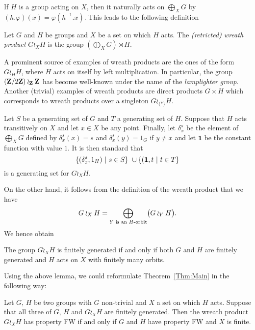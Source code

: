 If $H$ is a group acting on $X$, then it naturally acts on $\bigoplus_XG$
by $(h.\varphi)(x)=\varphi(h^{-1}.x)$.
This leads to the following definition
\begin{defn}\label{Def:WreathProd}
Let $G$ and $H$ be groups and $X$ be a set on which $H$ acts.
The \emph{(retricted) wreath product} $G\wr_XH$ is the group $(\bigoplus_XG)\rtimes H$.
\end{defn}
A prominent  source of examples of wreath products are the ones of the form $G\wr_HH$, where $H$ acts on itself by left multiplication.
In particular, the group $(\mathbf{Z}/2\mathbf{Z})\wr_{\mathbf{Z}}\mathbf{Z}$ has become well-known under the name of the \emph{lamplighter group}.
Another (trivial) examples of wreath products are direct products $G\times H$ which corresponds to wreath products over a singleton $G\wr_{\{*\}}H$.

Let $S$ be a generating set of $G$ and $T$ a generating set of $H$.
Suppose that $H$ acts transitively on $X$ and let $x\in X$ be any point.
Finally, let $\delta_x^s$ be the element of $\bigoplus_XG$ defined by $\delta_x^s(x)=s$ and $\delta_x^s(y)=1_G$ if $y\neq x$ and let $\mathbf 1$ be the constant function with value $1$.
It is then standard that 
\[
	\setst{(\delta_x^s,1_H)}{s \in S} \cup \setst{(\mathbf 1,t}{t \in T}
\]
is a generating set for $G\wr_XH$.

On the other hand, it follows from the definition of the wreath product that we have
\[
	G\wr_XH=\bigoplus_{Y\textnormal{ is an $H$-orbit}}\bigl(G\wr_YH\bigr).
\]
We hence obtain
%
%
\begin{lem}
The group $G\wr_XH$ is finitely generated if and only if both $G$ and $H$ are finitely generated and $H$ acts on $X$ with finitely many orbits.
\end{lem}
%
%
Using the above lemma, we could reformulate Theorem~\ref{Thm:Main} in the following way:
%
%
\begin{prop}
Let $G$, $H$ be two groups with $G$ non-trivial and $X$ a set on which $H$ acts. Suppose that all three of $G$, $H$ and $G\wr_XH$ are finitely generated. Then the wreath product $G\wr_XH$ has property FW if and only if $G$ and $H$ have property FW and $X$ is finite.
\end{prop}